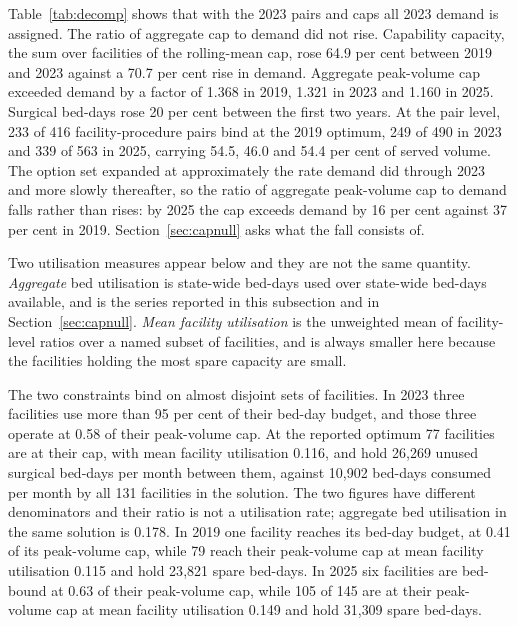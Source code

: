 Table~\ref{tab:decomp} shows that with the 2023 pairs and caps all 2023 demand is assigned. The ratio of aggregate cap to demand did not rise.
Capability capacity, the sum over facilities of the rolling-mean cap, rose 64.9
per cent between 2019 and 2023 against a 70.7 per cent rise in demand.
Aggregate peak-volume cap exceeded demand by a factor of 1.368 in 2019, 1.321 in 2023
and 1.160 in 2025. Surgical bed-days rose 20 per cent between the first two
years. At the pair level, 233 of 416 facility-procedure pairs bind at the 2019
optimum, 249 of 490 in 2023 and 339 of 563 in 2025, carrying 54.5, 46.0 and 54.4
per cent of served volume. The option set expanded at approximately the rate
demand did through 2023 and more slowly thereafter, so the ratio of aggregate peak-volume cap to demand falls rather than rises: by 2025
the cap exceeds demand by 16 per cent against 37 per cent in 2019. Section~\ref{sec:capnull}
asks what the fall consists of.

Two utilisation measures appear below and they are not the same quantity.
\emph{Aggregate} bed utilisation is state-wide bed-days used over state-wide
bed-days available, and is the series reported in this subsection and in Section~\ref{sec:capnull}. \emph{Mean facility utilisation} is the
unweighted mean of facility-level ratios over a named subset of facilities, and
is always smaller here because the facilities holding the most spare capacity are
small.

The two constraints bind on almost disjoint sets of facilities. In 2023 three
facilities use more than 95 per cent of their bed-day budget, and those three operate at
0.58 of their peak-volume cap. At the reported optimum 77 facilities are at their cap, with mean
facility utilisation 0.116, and hold 26{,}269 unused surgical bed-days per month
between them, against 10{,}902 bed-days consumed per month by all 131 facilities
in the solution. The two figures have different denominators and their ratio is
not a utilisation rate; aggregate bed utilisation in the same solution is 0.178.
In 2019 one facility reaches its bed-day budget, at 0.41 of its peak-volume cap,
while 79 reach their peak-volume cap at mean facility utilisation 0.115 and hold
23{,}821 spare bed-days. In 2025 six facilities are bed-bound at 0.63 of their
peak-volume cap, while 105 of 145 are at their peak-volume cap at mean facility
utilisation 0.149 and hold 31{,}309 spare bed-days.

